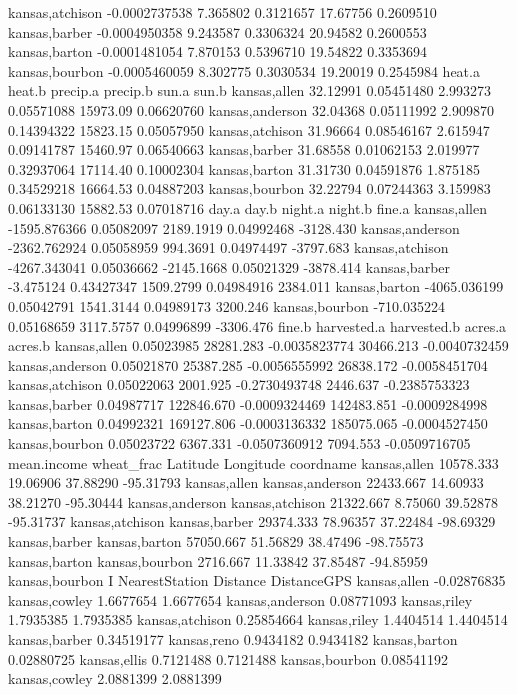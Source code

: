 \documentclass{report}
\begin{document}
\begin{Schunk}
\begin{Soutput}
kansas,atchison   -0.0002737538 7.365802 0.3121657 17.67756 0.2609510
kansas,barber     -0.0004950358 9.243587 0.3306324 20.94582 0.2600553
kansas,barton     -0.0001481054 7.870153 0.5396710 19.54822 0.3353694
kansas,bourbon    -0.0005460059 8.302775 0.3030534 19.20019 0.2545984
                  heat.a     heat.b precip.a   precip.b    sun.a      sun.b
kansas,allen    32.12991 0.05451480 2.993273 0.05571088 15973.09 0.06620760
kansas,anderson 32.04368 0.05111992 2.909870 0.14394322 15823.15 0.05057950
kansas,atchison 31.96664 0.08546167 2.615947 0.09141787 15460.97 0.06540663
kansas,barber   31.68558 0.01062153 2.019977 0.32937064 17114.40 0.10002304
kansas,barton   31.31730 0.04591876 1.875185 0.34529218 16664.53 0.04887203
kansas,bourbon  32.22794 0.07244363 3.159983 0.06133130 15882.53 0.07018716
                       day.a      day.b    night.a    night.b    fine.a
kansas,allen    -1595.876366 0.05082097  2189.1919 0.04992468 -3128.430
kansas,anderson -2362.762924 0.05058959   994.3691 0.04974497 -3797.683
kansas,atchison -4267.343041 0.05036662 -2145.1668 0.05021329 -3878.414
kansas,barber      -3.475124 0.43427347  1509.2799 0.04984916  2384.011
kansas,barton   -4065.036199 0.05042791  1541.3144 0.04989173  3200.246
kansas,bourbon   -710.035224 0.05168659  3117.5757 0.04996899 -3306.476
                    fine.b harvested.a   harvested.b    acres.a       acres.b
kansas,allen    0.05023985   28281.283 -0.0035823774  30466.213 -0.0040732459
kansas,anderson 0.05021870   25387.285 -0.0056555992  26838.172 -0.0058451704
kansas,atchison 0.05022063    2001.925 -0.2730493748   2446.637 -0.2385753323
kansas,barber   0.04987717  122846.670 -0.0009324469 142483.851 -0.0009284998
kansas,barton   0.04992321  169127.806 -0.0003136332 185075.065 -0.0004527450
kansas,bourbon  0.05023722    6367.331 -0.0507360912   7094.553 -0.0509716705
                mean.income wheat_frac Latitude Longitude       coordname
kansas,allen      10578.333   19.06906 37.88290 -95.31793    kansas,allen
kansas,anderson   22433.667   14.60933 38.21270 -95.30444 kansas,anderson
kansas,atchison   21322.667    8.75060 39.52878 -95.31737 kansas,atchison
kansas,barber     29374.333   78.96357 37.22484 -98.69329   kansas,barber
kansas,barton     57050.667   51.56829 38.47496 -98.75573   kansas,barton
kansas,bourbon     2716.667   11.33842 37.85487 -94.85959  kansas,bourbon
                          I NearestStation  Distance DistanceGPS
kansas,allen    -0.02876835  kansas,cowley 1.6677654   1.6677654
kansas,anderson  0.08771093   kansas,riley 1.7935385   1.7935385
kansas,atchison  0.25854664   kansas,riley 1.4404514   1.4404514
kansas,barber    0.34519177    kansas,reno 0.9434182   0.9434182
kansas,barton    0.02880725   kansas,ellis 0.7121488   0.7121488
kansas,bourbon   0.08541192  kansas,cowley 2.0881399   2.0881399
\end{Soutput}
\end{Schunk}
\end{document}
